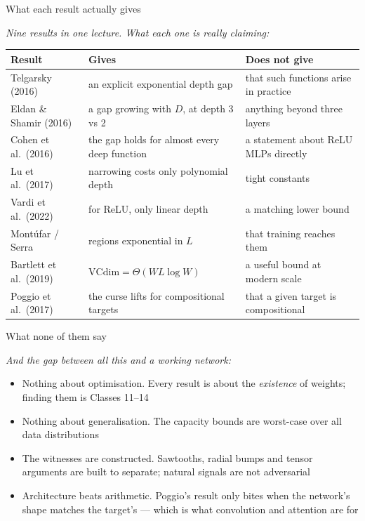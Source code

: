 \documentclass[aspectratio=169, 11pt]{beamer}
\newcommand{\bridge}[1]{%
  {\scriptsize\itshape\color{mcMuted} #1\par}\vspace{0.35em}}
\begin{document}
\begin{frame}{What each result actually gives}
  \bridge{Nine results in one lecture. What each one is really
  claiming:}
  \vspace{-0.05em}
  \centering
  \renewcommand{\arraystretch}{1.2}
  {\scriptsize
  \begin{tabular}{p{} p{}
                  p{}}
    \textbf{Result} & \textbf{Gives} & \textbf{Does not give}\\
    \hline
    Telgarsky (2016)
      & an explicit exponential depth gap
      & that such functions arise in practice\\
    Eldan \& Shamir (2016)
      & a gap growing with $D$, at depth 3 vs 2
      & anything beyond three layers\\
    Cohen et al.\ (2016)
      & the gap holds for almost every deep function
      & a statement about ReLU MLPs directly\\
    Lu et al.\ (2017)
      & narrowing costs only polynomial depth
      & tight constants\\
    Vardi et al.\ (2022)
      & for ReLU, only linear depth
      & a matching lower bound\\
    Mont\'ufar / Serra
      & regions exponential in $L$
      & that training reaches them\\
    Bartlett et al.\ (2019)
      & $\mathrm{VCdim}=\Theta(WL\log W)$
      & a useful bound at modern scale\\
    Poggio et al.\ (2017)
      & the curse lifts for compositional targets
      & that a given target is compositional\\
    \hline
  \end{tabular}}
\end{frame}

\begin{frame}{What none of them say}
  \bridge{And the gap between all this and a working network:}
  \vspace{0.3em}
  \begin{itemize}\setlength{\itemsep}{5pt}
    \item \alert{Nothing about optimisation.} Every result is about the
          \emph{existence} of weights; finding them is Classes 11--14
    \item \alert{Nothing about generalisation.} The capacity bounds are
          worst-case over all data distributions
    \item \alert{The witnesses are constructed.} Sawtooths, radial
          bumps and tensor arguments are built to separate; natural
          signals are not adversarial
    \item \alert{Architecture beats arithmetic.} Poggio's result only
          bites when the network's shape matches the target's ---
          which is what convolution and attention are for
  \end{itemize}
\end{frame}
\end{document}
